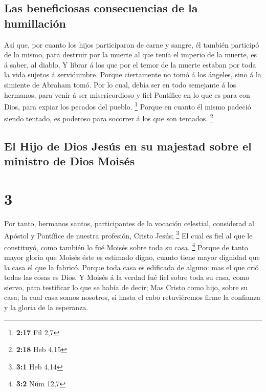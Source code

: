 \hypertarget{las-beneficiosas-consecuencias-de-la-humillaciuxf3n}{%
\subsection{Las beneficiosas consecuencias de la
humillación}\label{las-beneficiosas-consecuencias-de-la-humillaciuxf3n}}

 Así que, por cuanto los hijos participaron de carne y
sangre, él también participó de lo mismo, para destruir por la muerte al
que tenía el imperio de la muerte, es á saber, al diablo,
 Y librar á los que por el temor de la muerte estaban por
toda la vida sujetos á servidumbre.  Porque ciertamente
no tomó á los ángeles, sino á la simiente de Abraham tomó.
 Por lo cual, debía ser en todo semejante á los hermanos,
para venir á ser misericordioso y fiel Pontífice en lo que es para con
Dios, para expiar los pecados del pueblo. \footnote{\textbf{2:17} Fil
  2,7}  Porque en cuanto él mismo padeció siendo tentado,
es poderoso para socorrer á los que son tentados. \footnote{\textbf{2:18}
  Heb 4,15}

\hypertarget{el-hijo-de-dios-jesuxfas-en-su-majestad-sobre-el-ministro-de-dios-moisuxe9s}{%
\subsection{El Hijo de Dios Jesús en su majestad sobre el ministro de
Dios
Moisés}\label{el-hijo-de-dios-jesuxfas-en-su-majestad-sobre-el-ministro-de-dios-moisuxe9s}}

\hypertarget{section-2}{%
\section{3}\label{section-2}}

 Por tanto, hermanos santos, participantes de la vocación
celestial, considerad al Apóstol y Pontífice de nuestra profesión,
Cristo Jesús; \footnote{\textbf{3:1} Heb 4,14}  El cual es
fiel al que le constituyó, como también lo fué Moisés sobre toda su
casa. \footnote{\textbf{3:2} Núm 12,7}  Porque de tanto
mayor gloria que Moisés éste es estimado digno, cuanto tiene mayor
dignidad que la casa el que la fabricó.  Porque toda casa
es edificada de alguno: mas el que crió todas las cosas es Dios.
 Y Moisés á la verdad fué fiel sobre toda su casa, como
siervo, para testificar lo que se había de decir;  Mas
Cristo como hijo, sobre su casa; la cual casa somos nosotros, si hasta
el cabo retuviéremos firme la confianza y la gloria de la esperanza.

